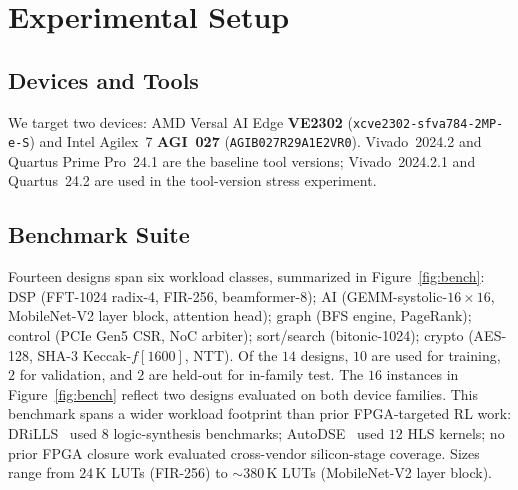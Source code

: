 \documentclass[journal]{IEEEtran}
\begin{document}
\section{Experimental Setup}
\label{sec:setup}

\subsection{Devices and Tools}
We target two devices: AMD Versal AI Edge \textbf{VE2302} (\texttt{xcve2302-sfva784-2MP-e-S}) and Intel Agilex~7 \textbf{AGI~027} (\texttt{AGIB027R29A1E2VR0}). Vivado~2024.2 and Quartus Prime Pro~24.1 are the baseline tool versions; Vivado~2024.2.1 and Quartus~24.2 are used in the tool-version stress experiment.

\subsection{Benchmark Suite}
Fourteen designs span six workload classes, summarized in Figure~\ref{fig:bench}: DSP (FFT-1024 radix-4, FIR-256, beamformer-8); AI (GEMM-systolic-$16{\times}16$, MobileNet-V2 layer block, attention head); graph (BFS engine, PageRank); control (PCIe Gen5 CSR, NoC arbiter); sort/search (bitonic-1024); crypto (AES-128, SHA-3 Keccak-$f[1600]$, NTT). Of the $14$ designs, $10$ are used for training, $2$ for validation, and $2$ are held-out for in-family test. The $16$ instances in Figure~\ref{fig:bench} reflect two designs evaluated on both device families. This benchmark spans a wider workload footprint than prior FPGA-targeted RL work: DRiLLS~\cite{hosny2020drills} used $8$ logic-synthesis benchmarks; AutoDSE~\cite{sohrabizadeh2022autodse} used $12$ HLS kernels; no prior FPGA closure work evaluated cross-vendor silicon-stage coverage. Sizes range from $24$\,K LUTs (FIR-256) to $\sim 380$\,K LUTs (MobileNet-V2 layer block).
\end{document}
